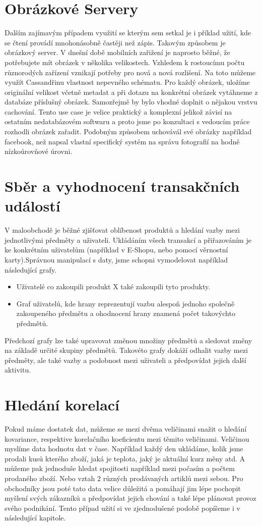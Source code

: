\section{Obrázkové Servery}
Dalším zajímavým případem využití se kterým sem setkal je i příklad užití, kde se čtení provádí mnohonásobně častěji než zápis. Takovým způsobem je obrázkový server. V dnešní době mobilních zařižení je naprosto běžné, že potřebujete mít obrázek v několika velikostech. Vzhledem k rostoucímu počtu různorodých zařízení vznikají potřeby pro nová a nová rozlišení. Na toto můžeme využít Cassandřinu vlastnost nepevného schématu. Pro každý obrázek, uložíme originální velikost včetně metadat a při dotazu na konkrétní obrázek vytáhneme z databáze příslušný obrázek. Samozřejmě by bylo vhodné doplnit o nějakou vrstvu cachování. Tento use case je velice praktický a komplexní jelikož závisí na ostatním nedatabázovém softwaru a proto jsme po konzultaci s vedoucím práce rozhodli obrázek zařadit. Podobným způsobem uchovávál své obrázky například facebook, než napsal vlastní specifický systém na správu fotografií na hodně nízkoúrovňové úrovni. 

\section{Sběr a vyhodnocení transakčních událostí}
V maloobchodě je běžné zjišťovat oblíbenost produktů a hledání vazby mezi jednotlivými předměty a uživateli. Ukládáním všech transakcí a přiřazováním je ke konkrétním uživatelům (například v E-Shopu, nebo pomocí věrnostní karty).Správnou manipulací s daty, jsme schopni vymodelovat například následující grafy.

\begin{itemize}
\item Uživatelé co zakoupili produkt X také zakoupili tyto produkty.
\item Graf uživatelů, kde hrany reprezentují vazbu alespoň jednoho společně zakoupeného předmětu a ohodnocení hrany znamená počet takovýchto předmětů. 
\end{itemize} 
Předchozí grafy lze také upravovat změnou množiny předmětů a sledovat změny na základě určité skupiny předmětů. Takovéto grafy dokáží odhalit vazby mezi předměty, ale také vazby a podobnost mezi uživateli a předpovídat jejich další aktivitu. 
\newpage
\section{Hledání korelací}
Pokud máme dostatek dat, můžeme se mezi dvěma veličinami snažit o hledání kovariance, respektive korelačního koeficientu mezi těmito veličinami. Veličinou myslíme data hodnotu dat v čase. Například každý den ukládáme, kolik jsme prodali kusů kterého zboží, jaká je teplota, jaký je aktuální kurz měny atd. A můžeme pak jednoduše hledat spojitosti například mezi počasím a počtem prodaného zboží. Nebo vztah 2 různých prodávaných artiklů mezi sebou. Pro obchodníky jsou poté tato data velice důležitá a pomáhají jim lépe pochopit myšlení svých zákazníků a předpovídat jejich chování a také lépe plánovat provoz svého podnikání. Tento případ užití si ve zjednodušené podobě popíšeme i v následující kapitole. 


